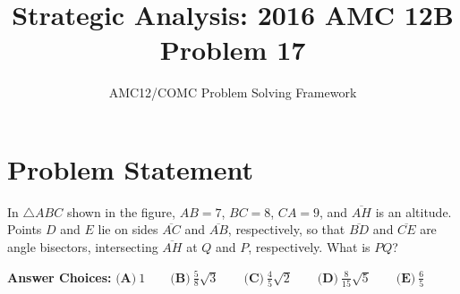 \documentclass[12pt]{article}
\title{\textbf{Strategic Analysis: 2016 AMC 12B Problem 17}}
\author{AMC12/COMC Problem Solving Framework}
\date{}
\begin{document}
\maketitle

\section*{Problem Statement}

In $\triangle ABC$ shown in the figure, $AB=7$, $BC=8$, $CA=9$, and $\overline{AH}$ is an altitude. Points $D$ and $E$ lie on sides $\overline{AC}$ and $\overline{AB}$, respectively, so that $\overline{BD}$ and $\overline{CE}$ are angle bisectors, intersecting $\overline{AH}$ at $Q$ and $P$, respectively. What is $PQ$?

\textbf{Answer Choices:} 
$\textbf{(A)}\ 1 \qquad \textbf{(B)}\ \frac{5}{8}\sqrt{3} \qquad \textbf{(C)}\ \frac{4}{5}\sqrt{2} \qquad \textbf{(D)}\ \frac{8}{15}\sqrt{5} \qquad \textbf{(E)}\ \frac{6}{5}$
\end{document}
